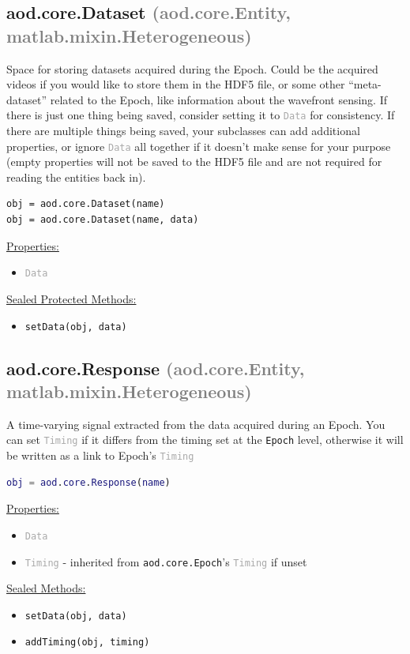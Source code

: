 \documentclass[10pt]{exam}
\newcommand\myparent[1]{\textcolor{gray}{(#1)}}
\newcommand\aodclass[1]{\textcolor{codeblue}{\texttt{#1}}}
\newcommand\aodprop[1]{\textcolor{darkgray}{\texttt{#1}}}
\newcommand\aodfcn[1]{\textcolor{darkteal}{\texttt{#1}}}
\newcommand\docheader[1]{\vspace{0.6ex}\noindent\underline{#1}\vspace{0.15ex}}
\begin{document}
	\subsection{aod.core.Dataset \myparent{aod.core.Entity, matlab.mixin.Heterogeneous}}
		\noindent Space for storing datasets acquired during the Epoch. Could be the acquired videos if you would like to store them in the HDF5 file, or some other ``meta-dataset'' related to the Epoch, like information about the wavefront sensing. If there is just one thing being saved, consider setting it to \aodprop{Data} for consistency. If there are multiple things being saved, your subclasses can add additional properties, or ignore \aodprop{Data} all together if it doesn't make sense for your purpose (empty properties will not be saved to the HDF5 file and are not required for reading the entities back in).
		\begin{lstlisting}
obj = aod.core.Dataset(name)
obj = aod.core.Dataset(name, data)
		\end{lstlisting}		
		\docheader{Properties:}
		\begin{itemize}
			\item \aodprop{Data}
		\end{itemize}
		\docheader{Sealed Protected Methods:}
		\begin{itemize}
			\item \aodfcn{setData(obj, data)}
		\end{itemize}
	
	\subsection{aod.core.Response \myparent{aod.core.Entity, matlab.mixin.Heterogeneous}} 
		\noindent A time-varying signal extracted from the data acquired during an Epoch. You can set \aodprop{Timing} if it differs from the timing set at the \aodclass{Epoch} level, otherwise it will be written as a link to Epoch's \aodprop{Timing}
		\begin{lstlisting}[language=matlab]
obj = aod.core.Response(name)
		\end{lstlisting} 
		\docheader{Properties:}
		\begin{itemize}
			\item \aodprop{Data}
			\item \aodprop{Timing} - inherited from \aodclass{aod.core.Epoch}'s \aodprop{Timing} if unset
		\end{itemize}
		\docheader{Sealed Methods:}
		\begin{itemize}
			\item \aodfcn{setData(obj, data)}
			\item \aodfcn{addTiming(obj, timing)}
		\end{itemize}
	
\end{document}
